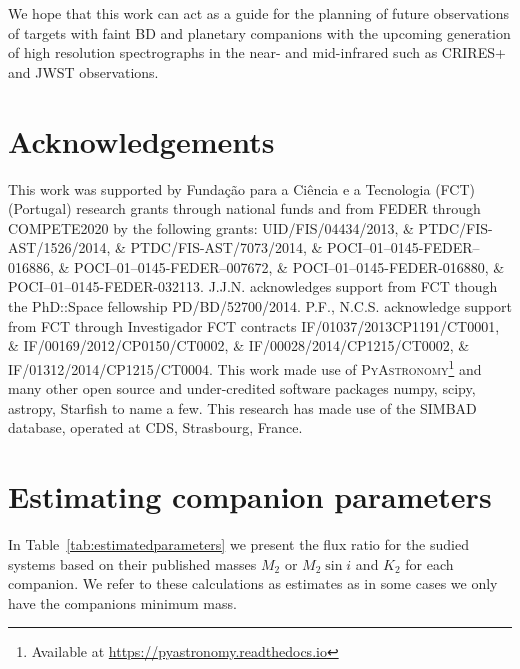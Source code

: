 \documentclass[fleqn,usenatbib]{mnras}
\newcommand*\bl{\color{blue}}
\begin{document}
    We hope that this work can act as a guide for the planning of future observations of targets with faint BD and planetary companions with the upcoming generation of high resolution spectrographs in the near- and mid-infrared such as CRIRES+ and JWST observations.
    
    
    \section*{Acknowledgements}
    This work was supported by Funda\c{c}\~ao para a Ci\^encia e a Tecnologia (FCT) (Portugal) research grants through national funds and from FEDER through COMPETE2020 by the following grants: UID/FIS/04434/2013, \&  PTDC/FIS-AST/1526/2014, \& PTDC/FIS-AST/7073/2014, \& POCI--01--0145-FEDER--016886, \& POCI--01--0145-FEDER--007672, \& POCI--01--0145-FEDER-016880, \& POCI--01--0145-FEDER-032113.
    J.J.N. acknowledges support from FCT though the PhD::Space fellowship PD/BD/52700/2014.
    P.F., N.C.S. acknowledge support from FCT through Investigador FCT contracts IF/01037/2013CP1191/CT0001, \& IF/00169/2012/CP0150/CT0002, \& IF/00028/2014/CP1215/CT0002, \& IF/01312/2014/CP1215/CT0004.
    This work made use of \textsc{PyAstronomy}\footnote{Available at \href{https://pyastronomy.readthedocs.io}{https://pyastronomy.readthedocs.io}} and many other open source and under-credited software packages numpy, scipy, astropy, Starfish to name a few.
    This research has made use of the SIMBAD database, operated at CDS, Strasbourg, France.
    
    
    
    
    \appendix
    
    
    
    
    \section{Estimating companion parameters}
    
    {\bl In Table~\ref{tab:estimatedparameters} we present the flux ratio for the sudied systems based on their published masses \(M_2\) or \(M_{2}\sin{i}\) and \(K_2\) for each companion}. We refer to these calculations as estimates as in some cases we only have the companions minimum mass.
    
\end{document}
